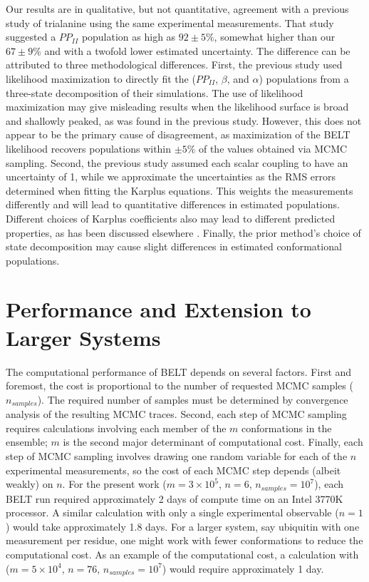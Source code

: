 \documentclass[12pt]{article}
\begin{document}
Our results are in qualitative, but not quantitative, agreement with a previous study of trialanine \cite{Graf2007} using the same experimental measurements.  That study suggested a $PP_{II}$ population as high as $92 \pm 5\%$, somewhat higher than our $67 \pm 9 \%$ and with a twofold lower estimated uncertainty.  The difference can be attributed to three methodological differences.  First, the previous study used likelihood maximization to directly fit the ($PP_{II}$, $\beta$, and $\alpha$) populations from a three-state decomposition of their simulations.  The use of likelihood maximization may give misleading results when the likelihood surface is broad and shallowly peaked, as was found in the previous study.  However, this does not appear to be the primary cause of disagreement, as maximization of the BELT likelihood recovers populations within $\pm 5\%$ of the values obtained via MCMC sampling.  Second, the previous study assumed each scalar coupling to have an uncertainty of 1, while we approximate 
the uncertainties as the RMS errors 
determined when fitting the Karplus equations.  This weights the measurements differently and will lead to quantitative differences in estimated populations.  Different choices of Karplus coefficients also may lead to different predicted properties, as has been discussed elsewhere \cite{best2008, markwick2009structural}.    Finally, the prior method's choice of state decomposition may cause slight differences in estimated conformational populations.  

\section*{Performance and Extension to Larger Systems}

The computational performance of BELT depends on several factors.  First and foremost, the cost is proportional to the number of requested MCMC samples ($n_{samples}$).  The required number of samples must be determined by convergence analysis of the resulting MCMC traces.  Second, each step of MCMC sampling requires calculations involving each member of the $m$ conformations in the ensemble; $m$ is the second major determinant of computational cost.  Finally, each step of MCMC sampling involves drawing one random variable for each of the $n$ experimental measurements, so the cost of each MCMC step depends (albeit weakly) on $n$.  For the present work ($m = 3 \times 10^5$, $n = 6$, $n_{samples} = 10^7$), each BELT run required approximately 2 days of compute time on an Intel 3770K processor.  A similar calculation with only a single experimental observable ($n = 1$) would take approximately 1.8 days.  For a larger system, say ubiquitin with one measurement per residue, one might work with fewer conformations 
to 
reduce the computational cost.  As an example of the computational cost, a calculation with ($m = 5 \times 10^4$, $n = 76$, $n_{samples} = 10^7$) would require approximately 1 day.  
\end{document}

